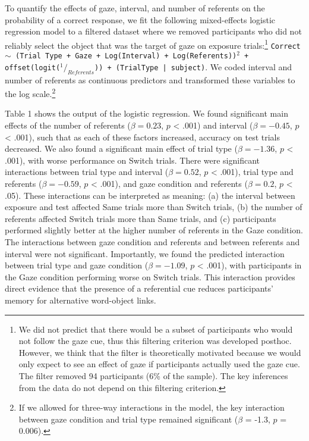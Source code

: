\documentclass[oneside]{report}
\begin{document}
To quantify the effects of gaze, interval, and number of referents on
the probability of a correct response, we fit the following
mixed-effects logistic regression model to a filtered dataset where we
removed participants who did not reliably select the object that was the
target of gaze on exposure trials:\footnote{We did not predict that
  there would be a subset of participants who would not follow the gaze
  cue, thus this filtering criterion was developed posthoc. However, we
  think that the filter is theoretically motivated because we would only
  expect to see an effect of gaze if participants actually used the gaze
  cue. The filter removed 94 participants (6\% of the sample). The key
  inferences from the data do not depend on this filtering criterion.}
\texttt{Correct $\sim$ (Trial Type + Gaze + Log(Interval) + Log(Referents))$^2$ + offset(logit($^1/_{Referents}$)) + (TrialType | subject)}.
We coded interval and number of referents as continuous predictors and
transformed these variables to the log scale.\footnote{If we allowed for
  three-way interactions in the model, the key interaction between gaze
  condition and trial type remained significant (\(\beta\) = -1.3, \(p\)
  = 0.006).}

Table 1 shows the output of the logistic regression. We found
significant main effects of the number of referents (\(\beta = 0.23\),
\(p\) \textless{} .001) and interval (\(\beta = -0.45\), \(p\)
\textless{} .001), such that as each of these factors increased,
accuracy on test trials decreased. We also found a significant main
effect of trial type (\(\beta = -1.36\), \(p\) \textless{} .001), with
worse performance on Switch trials. There were significant interactions
between trial type and interval (\(\beta = 0.52\), \(p\) \textless{}
.001), trial type and referents (\(\beta = -0.59\), \(p\) \textless{}
.001), and gaze condition and referents (\(\beta = 0.2\), \(p\)
\textless{} .05). These interactions can be interpreted as meaning: (a)
the interval between exposure and test affected Same trials more than
Switch trials, (b) the number of referents affected Switch trials more
than Same trials, and (c) participants performed slightly better at the
higher number of referents in the Gaze condition. The interactions
between gaze condition and referents and between referents and interval
were not significant. Importantly, we found the predicted interaction
between trial type and gaze condition (\(\beta = -1.09\), \(p\)
\textless{} .001), with participants in the Gaze condition performing
worse on Switch trials. This interaction provides direct evidence that
the presence of a referential cue reduces participants' memory for
alternative word-object links.
\end{document}

